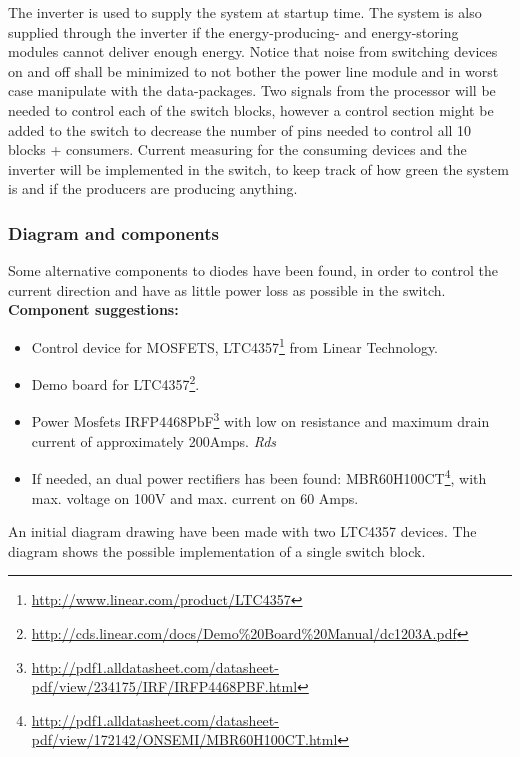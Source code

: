 The inverter is used to supply the system at startup time. The system is also supplied through the inverter if the energy-producing- and energy-storing modules cannot deliver enough energy. 
\p Notice that noise from switching devices on and off shall be minimized to not bother the power line module and in worst case manipulate with the data-packages. 
\p Two signals from the processor will be needed to control each of the switch blocks, however a control section might be added to the switch to decrease the number of pins needed to control all 10 blocks + consumers. 
\p Current measuring for the consuming devices and the inverter will be implemented in the switch, to keep track of how green the system is and if the producers are producing anything.  
\subsubsection{Diagram and components}
Some alternative components to diodes have been found, in order to control the current direction and have as little power loss as possible in the switch. 
\textbf{Component suggestions:}
\begin{itemize}
	\item Control device for MOSFETS, LTC4357\footnote{\url{http://www.linear.com/product/LTC4357}} from Linear Technology.
	\item Demo board for LTC4357\footnote{\url{http://cds.linear.com/docs/Demo\%20Board\%20Manual/dc1203A.pdf}}.
	\item Power Mosfets IRFP4468PbF\footnote{\url{http://pdf1.alldatasheet.com/datasheet-pdf/view/234175/IRF/IRFP4468PBF.html}} with low on resistance and maximum drain current of approximately 200Amps. \textit{Rds}
	\item If needed, an dual power rectifiers has been found: MBR60H100CT\footnote{\url{http://pdf1.alldatasheet.com/datasheet-pdf/view/172142/ONSEMI/MBR60H100CT.html}}, with max. voltage on 100V and max. current on 60 Amps.
\end{itemize}
An initial diagram drawing have been made with two LTC4357 devices. The diagram shows the possible implementation of a single switch block.

